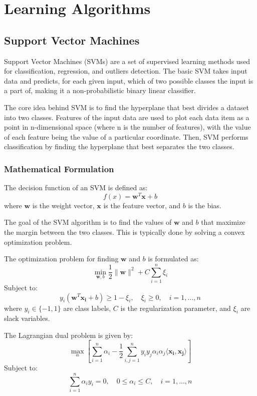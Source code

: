 \chapter{Learning Algorithms}
\label{app:Learning}


\section{Support Vector Machines}
Support Vector Machines (SVMs) are a set of supervised learning methods used for classification, regression, and outliers detection. The basic SVM takes input data and predicts, for each given input, which of two possible classes the input is a part of, making it a non-probabilistic binary linear classifier.


The core idea behind SVM is to find the hyperplane that best divides a dataset into two classes. Features of the input data are used to plot each data item as a point in n-dimensional space (where n is the number of features), with the value of each feature being the value of a particular coordinate. Then, SVM performs classification by finding the hyperplane that best separates the two classes.

\subsection*{Mathematical Formulation}
The decision function of an SVM is defined as:
\[ f(x) = \mathbf{w}^T\mathbf{x} + b \]
where $\mathbf{w}$ is the weight vector, $\mathbf{x}$ is the feature vector, and $b$ is the bias.

The goal of the SVM algorithm is to find the values of $\mathbf{w}$ and $b$ that maximize the margin between the two classes. This is typically done by solving a convex optimization problem.


The optimization problem for finding \(\mathbf{w}\) and \(b\) is formulated as:
\[
\min_{\mathbf{w}, b} \frac{1}{2} \|\mathbf{w}\|^2 + C \sum_{i=1}^{n} \xi_i
\]
Subject to:
\[
y_i (\mathbf{w}^T \mathbf{x_i} + b) \geq 1 - \xi_i, \quad \xi_i \geq 0, \quad i=1,...,n
\]
where \(y_i \in \{-1, 1\}\) are class labels, \(C\) is the regularization parameter, and \(\xi_i\) are slack variables.


The Lagrangian dual problem is given by:
\[
\max_{\alpha} \left[ \sum_{i=1}^{n} \alpha_i - \frac{1}{2} \sum_{i,j=1}^{n} y_i y_j \alpha_i \alpha_j \langle \mathbf{x_i}, \mathbf{x_j} \rangle \right]
\]
Subject to:
\[
\sum_{i=1}^{n} \alpha_i y_i = 0, \quad 0 \leq \alpha_i \leq C, \quad i=1,...,n
\]


